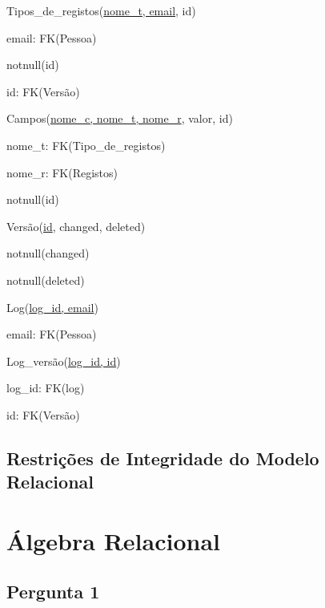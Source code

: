 \documentclass[11pt,a4paper]{article}
\begin{document}
\begin{description}[noitemsep]
	\item Tipos\_de\_registos(\underline{nome\_t, email}, id)
	\item email: FK(Pessoa)
	\item notnull(id)
	\item id: FK(Vers\~{a}o)
\end{description}
\newpage

\begin{description}[noitemsep]
	\item Campos(\underline{nome\_c, nome\_t, nome\_r}, valor, id)
	\item nome\_t: FK(Tipo\_de\_registos)
	\item nome\_r: FK(Registos)
	\item notnull(id)
\end{description}

\begin{description}[noitemsep]
	\item Vers\~{a}o(\underline{id}, changed, deleted)
	\item notnull(changed)
	\item notnull(deleted)
\end{description}

\begin{description}[noitemsep]
	\item Log(\underline{log\_id, email})
	\item email: FK(Pessoa)
\end{description}

\begin{description}[noitemsep]
	\item Log\_vers\~{a}o(\underline{log\_id, id})
	\item log\_id: FK(log)
	\item id: FK(Vers\~{a}o)
\end{description}








\subsection{Restri\c{c}\~oes de Integridade do Modelo Relacional}
\section{\'{A}lgebra Relacional}
\subsection{Pergunta 1}
\end{document}
